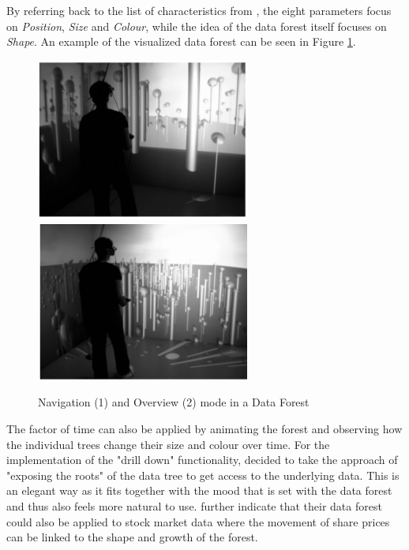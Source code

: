 By referring back to the list of characteristics from \cite{Stone1994}, the eight parameters focus on \textit{Position}, \textit{Size} and \textit{Colour}, while the idea of the data forest itself focuses on \textit{Shape}. An example of the visualized data forest can be seen in Figure \ref{fig:dataforest}.
\begin{figure}[t]
	\begin{center}
		\includegraphics[width=7cm]{03_Figures/05_LitReview/Jamieson2007_DataTree.png}
		\includegraphics[width=7cm]{03_Figures/05_LitReview/Jamieson2007_DataTreeOverview.png}
		\caption[Navigation and Overview mode in a Data Forest]{Navigation (1) and Overview (2) mode in a Data Forest \citep{Jamieson2007}}
		\label{fig:dataforest}
	\end{center}
\end{figure}
The factor of time can also be applied by animating the forest and observing how the individual trees change their size and colour over time. For the implementation of the "drill down" functionality, \cite{Jamieson2007} decided to take the approach of "exposing the roots" of the data tree to get access to the underlying data. This is an elegant way as it fits together with the mood that is set with the data forest and thus also feels more natural to use. \cite{Jamieson2007} further indicate that their data forest could also be applied to stock market data where the movement of share prices can be linked to the shape and growth of the forest.


